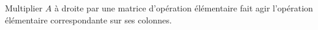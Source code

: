 Multiplier $A$ à droite par une matrice d'opération élémentaire fait agir l'opération élémentaire correspondante sur ses colonnes. 

\begin{reponses}
\end{reponses}

